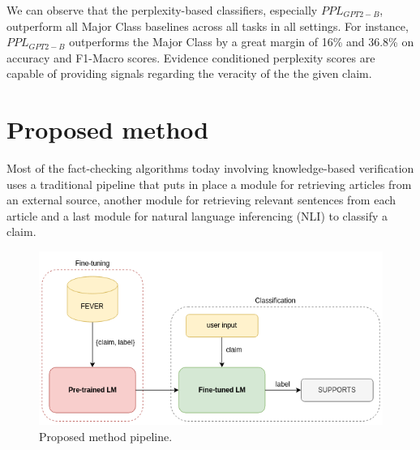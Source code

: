 \documentclass[10pt, english]{report}
\begin{document}
We can observe that the perplexity-based classifiers, especially $PPL_{GPT2-B}$, outperform all Major Class baselines across all
tasks in all settings. For instance, $PPL_{GPT2-B}$ outperforms the Major Class by a great margin of
16\% and 36.8\% on accuracy and F1-Macro scores. Evidence conditioned perplexity scores are capable of providing signals regarding the veracity of the the given claim.

%

\chapter{Proposed method}
Most of the fact-checking algorithms today involving knowledge-based verification uses a traditional pipeline that puts in place a module for retrieving articles from an external source, another module for retrieving relevant sentences from each article and a last module for natural language inferencing (NLI) to classify a claim.

\begin{figure}[htp]
    \centering
    \includegraphics[scale=0.5]{img/processing_pipeline.png}
    \caption{Proposed method pipeline.}
    \label{fig:processing_pipeline}
\end{figure}
\end{document}
